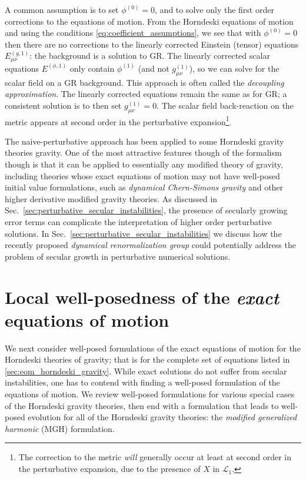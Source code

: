 \documentclass{ws-ijmpd}
\begin{document}
A common assumption is to set $\phi^{(0)}=0$, and to solve only the first
order corrections to the equations of motion.
From the Horndeski equations of motion and using the
conditions \eqref{eq:coefficient_assumptions}, 
we see that with $\phi^{(0)}=0$
then there are no corrections to the linearly corrected
Einstein (tensor) equations $E^{(g,1)}_{\mu\nu}$: the background is
a solution to GR.
The linearly corrected
scalar equations $E^{(\phi,1)}$
only contain $\phi^{(1)}$ (and not $g_{\mu\nu}^{(1)}$), so we
can solve for the scalar field on a GR background.
This approach is often called the \emph{decoupling approximation}.
The linearly corrected equations remain the same as for GR; a
consistent solution is to then set $g^{(1)}_{\mu\nu}=0$.
The scalar field back-reaction on the metric appears at second order
in the perturbative expansion\footnote{The correction to the
metric \emph{will} generally 
occur at least at second order in the perturbative expansion,
due to the presence of $X$ in $\mathcal{L}_1$.}.

The naive-perturbative approach has been applied to some Horndeski 
gravity theories gravity\cite{Witek:2018dmd,Okounkova:2019zep,Okounkova:2020rqw}.
One of the most attractive features though of the formalism though is that
it can be applied to essentially any modified theory of gravity,
including theories whose exact equations of motion may not 
have well-posed initial value formulations, such
as \emph{dynamical Chern-Simons gravity}\cite{Alexander:2009tp,
Yunes:2013dva,Delsate:2014hba,
Okounkova:2017yby,Okounkova:2018abo,Okounkova:2018pql} 
and other higher derivative modified gravity 
theories\cite{Endlich:2017tqa,Cayuso:2020lca}.
As discussed in Sec.~\ref{sec:perturbative_secular_instabilities}, 
the presence of secularly growing
error terms can complicate the interpretation of higher order
perturbative solutions.
In Sec.~\ref{sec:perturbative_secular_instabilities} 
we discuss how the recently proposed
\emph{dynamical renormalization group} could potentially address
the problem of secular growth in perturbative numerical solutions.

\section{Local well-posedness of the \emph{exact} equations of motion
\label{sec:local_well_posedness_exact_eom}
}
We next consider well-posed formulations of the exact
equations of motion for the Horndeski theories of gravity; that is
for the complete set of equations listed in \ref{sec:eom_horndeski_gravity}.
While exact solutions do not suffer from secular instabilities, 
one has to contend with finding a well-posed formulation of
the equations of motion. We review well-posed formulations
for various special cases of the Horndeski gravity theories, then
end with a formulation that leads to well-posed evolution
for all of the Horndeski gravity theories: the \emph{modified
generalized harmonic} (MGH) formulation\cite{Kovacs:2020pns,Kovacs:2020ywu}.
\end{document}
